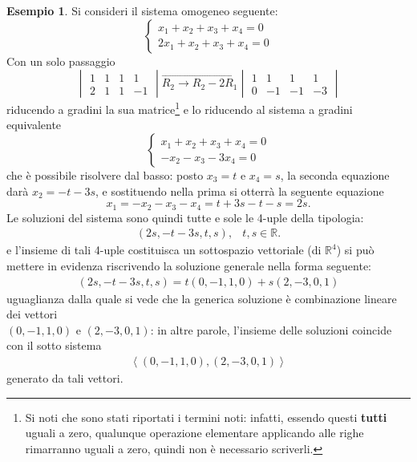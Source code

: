 \documentclass{book}
\theoremstyle{definition}
\newtheorem{es}{Esempio}[section]
\theoremstyle{plain}
\begin{document}
\begin{es}
  \label{es:gauss-jordan4}
  Si consideri il sistema omogeneo seguente:
  \begin{equation}
    \label{eq:gauss-jordan4-1}
    \begin{cases}
      x_1+x_2+x_3+x_4=0\\
      2x_1+x_2+x_3+x_4=0
    \end{cases}
  \end{equation}
  Con un solo passaggio
  \begin{equation*}
    \begin{vmatrix}
      1 & 1 & 1 & 1\\
      2 & 1 & 1 & -1
    \end{vmatrix}\overrightarrow{R_2\to R_2-2R_1}
    \begin{vmatrix}
      1 & 1 & 1 & 1\\
      0 & -1 & -1 & -3
    \end{vmatrix}
  \end{equation*}
  riducendo a gradini la sua matrice\footnote{Si noti che sono stati riportati
    i termini noti: infatti, essendo questi \textbf{tutti} uguali a zero,
    qualunque operazione elementare applicando alle righe rimarranno uguali a
    zero, quindi non è necessario scriverli.} e lo riducendo al sistema a gradini
  equivalente
  \begin{equation*}
    \begin{cases}
      x_1+x_2+x_3+x_4=0\\
      -x_2-x_3-3x_4=0
    \end{cases}
  \end{equation*}
  che è possibile risolvere dal basso: posto $x_3=t$ e $x_4=s$, la seconda
  equazione darà $x_2=-t-3s$, e sostituendo nella prima si otterrà la seguente
  equazione
  \begin{equation*}
    x_1=-x_2-x_3-x_4=t+3s-t-s=2s.
  \end{equation*}
  Le soluzioni del sistema sono quindi tutte e sole le 4-uple della tipologia:
  \begin{eqnarray*}
    (2s,-t-3s,t,s), & t,s\in \mathds{R}.
  \end{eqnarray*}
  e l'insieme di tali 4-uple costituisca un sottospazio vettoriale (di $\mathds{R}^4$)
  si può mettere in evidenza riscrivendo la soluzione generale nella forma seguente:
  \begin{eqnarray*}
    (2s,-t-3s,t,s)=t(0,-1,1,0)+s(2,-3,0,1)
  \end{eqnarray*}
  uguaglianza dalla quale si vede che la generica soluzione è combinazione lineare
  dei vettori\\ $(0,-1,1,0)$ e $(2,-3,0,1)$: in altre parole, l'insieme delle soluzioni
  coincide con il sotto sistema
  \begin{eqnarray*}
    \left<(0,-1,1,0),(2,-3,0,1)\right>
  \end{eqnarray*}
  generato da tali vettori.
\end{es}
\end{document}
